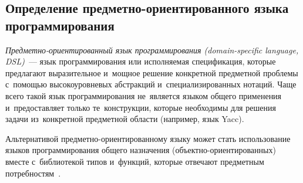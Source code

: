 \subsection{Определение предметно-ориентированного языка программирования} \label{sub121}

\textit{Предметно-ориентированный язык программирования (domain-specific language, DSL)}~--- язык программирования или исполняемая спецификация, которые предлагают выразительное и~мощное решение конкретной предметной проблемы с~помощью высокоуровневых абстракций и~специализированных нотаций. Чаще всего такой язык программирования не~является языком общего применения и~предоставляет только те~конструкции, которые необходимы для решения задачи из~конкретной предметной области (например, язык Yacc).

Альтернативой предметно-ориентированному языку может стать использование языков программирования общего назначения (объектно-ориентированных) вместе с~библиотекой типов и~функций, которые отвечают предметным потребностям~\cite{Deursen1998}.